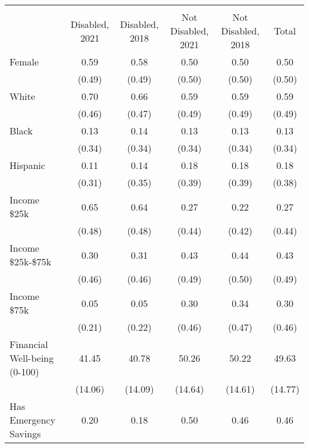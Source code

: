 {
\def\sym#1{\ifmmode^{#1}\else\(^{#1}\)\fi}
\begin{tabular}{l*{5}{c}}
\hline\hline
                    &\multicolumn{5}{c}{}                                            \\
                    &Disabled, 2021&Disabled, 2018&Not Disabled, 2021&Not Disabled, 2018&       Total\\
\hline
Female              &        0.59&        0.58&        0.50&        0.50&        0.50\\
                    &      (0.49)&      (0.49)&      (0.50)&      (0.50)&      (0.50)\\
White               &        0.70&        0.66&        0.59&        0.59&        0.59\\
                    &      (0.46)&      (0.47)&      (0.49)&      (0.49)&      (0.49)\\
Black               &        0.13&        0.14&        0.13&        0.13&        0.13\\
                    &      (0.34)&      (0.34)&      (0.34)&      (0.34)&      (0.34)\\
Hispanic            &        0.11&        0.14&        0.18&        0.18&        0.18\\
                    &      (0.31)&      (0.35)&      (0.39)&      (0.39)&      (0.38)\\
Income \<\$25k       &        0.65&        0.64&        0.27&        0.22&        0.27\\
                    &      (0.48)&      (0.48)&      (0.44)&      (0.42)&      (0.44)\\
                    Income \$25k-\$75k    &        0.30&        0.31&        0.43&        0.44&        0.43\\
                    &      (0.46)&      (0.46)&      (0.49)&      (0.50)&      (0.49)\\
                    Income \>\$75k       &        0.05&        0.05&        0.30&        0.34&        0.30\\
                    &      (0.21)&      (0.22)&      (0.46)&      (0.47)&      (0.46)\\
Financial Well-being (0-100)&       41.45&       40.78&       50.26&       50.22&       49.63\\
                    &     (14.06)&     (14.09)&     (14.64)&     (14.61)&     (14.77)\\
Has Emergency Savings&        0.20&        0.18&        0.50&        0.46&        0.46\\

\end{tabular}}
